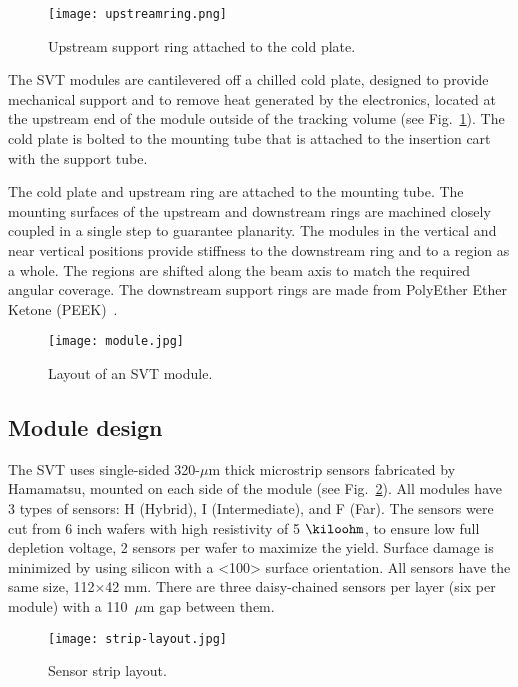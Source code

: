 \begin{figure}[hbt] 
\centering 
\texttt{[image: upstreamring.png]}
\caption{Upstream support ring attached to the cold plate.}
\label{fig:upstreamring}
\end{figure}

 The SVT modules are cantilevered off a chilled cold plate, designed to provide mechanical support and to remove heat generated by the electronics, located at the upstream end of the module outside of the tracking volume (see Fig.~\ref{fig:upstreamring}). The cold plate is bolted to the mounting tube that is attached to the insertion cart with the support tube. 
 
The cold plate and upstream ring are attached to the mounting tube. The mounting surfaces of the upstream and downstream rings are machined closely coupled in a single step to guarantee planarity. The modules in the vertical and near vertical positions provide stiffness to the downstream ring and to a region as a whole. The regions are shifted along the beam axis to match the required angular coverage. The downstream support rings are made from PolyEther Ether Ketone (PEEK)~\cite{NIMVCC}. 

\begin{figure}[hbt] 
\centering 
\texttt{[image: module.jpg]}
\caption{Layout of an SVT module.}
\label{fig:module}
\end{figure}

\subsection{Module design}

The SVT uses single-sided 320-$\mu$m thick microstrip sensors fabricated by Hamamatsu, mounted on each side of the module (see Fig.~\ref{fig:module}). All modules have 3 types of sensors: H (Hybrid), I (Intermediate), and F (Far). The sensors were cut from 6 inch wafers with high resistivity of 5 $\kiloohm$, to ensure low full depletion voltage, 2 sensors per wafer to maximize the yield. Surface damage is minimized by using silicon with a <100> surface orientation. All sensors have the same size, 112$\times$42 mm. There are three daisy-chained sensors per layer (six per module) with a 110~$\mu$m gap between them. 

\begin{figure}[hbt] 
\centering 
\texttt{[image: strip-layout.jpg]}
\caption{Sensor strip layout.}
\label{fig:strip-layout}
\end{figure}


